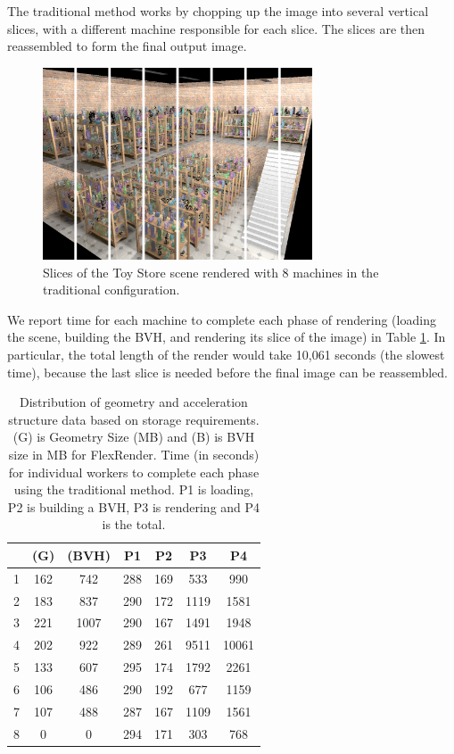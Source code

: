 \documentclass[a4paper,twoside]{article}
\begin{document}
The traditional method works by chopping up the image into several vertical
slices, with a different machine responsible for each slice. The slices are
then reassembled to form the final output image.

\begin{figure}[h!]
    \centering
    \includegraphics[width=80mm]{images/toystore-sliced.png}

    \caption{Slices of the Toy Store scene rendered with 8 machines in the traditional configuration.}
    \label{fig:toystoresliced}
\end{figure}

We report time for each machine to complete each phase of rendering (loading
the scene, building the BVH, and rendering its slice of the image) in Table
\ref{tb:traditionaltimes}. In particular, the total length of the render would
take 10,061 seconds (the slowest time), because the last slice is needed before
the final image can be reassembled.

\begin{table}
\begin{center}
\begin{tabular}{|l||c|c||c|c|c||c|}
    \hline
    & (G) & (BVH) & P1 & P2 & P3 & P4\\
    \hline
    \hline
  1 & 162 & 742 &        288 & 169 & 533 & 990\\
    \hline
    2 & 183 & 837 &     290 & 172 & 1119 & 1581 \\
    \hline
    3 & 221 & 1007 &    290 & 167 & 1491 & 1948 \\
    \hline
   4 &  202 & 922 &     289 & 261 & 9511 & 10061 \\
    \hline
    5 & 133 & 607 &     295 & 174 & 1792 & 2261 \\
    \hline
    6 & 106 & 486 &     290 & 192 & 677 & 1159\\
    \hline
    7 & 107 & 488    &287 & 167 & 1109 & 1561 \\
    \hline
    8 & 0 & 0  &       294 & 171 & 303 & 768 \\
    \hline
\end{tabular}
\caption{Distribution of geometry and acceleration structure data based on storage requirements. (G) is Geometry Size (MB) and (B)  is BVH size in MB for FlexRender.  Time (in seconds) for individual workers to complete each phase using the traditional method. P1 is loading, P2 is building a BVH, P3 is rendering and P4 is the total.}
\label{tb:traditionaltimes}
\end{center}
\end{table}
\end{document}
